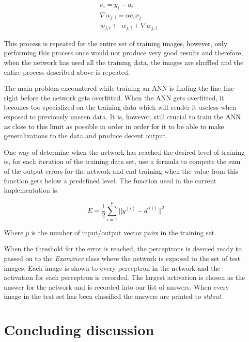\documentclass[12pt]{article}
\begin{document}
\begin{align*}
  &e_i = y_i - a_i\\
  &\nabla w_{j,i} = \alpha e_ix_j\\
  &w_{j,i} \leftarrow w_{j,i} + \nabla w_{j,i}
\end{align*}

This process is repeated for the entire set of training images, however,
only performing this process once would not produce very good results and
therefore, when the network has used all the training data, the images
are shuffled and the entire process described above is repeated.

The main problem encountered while training an ANN is finding the fine line
right before the network gets overfitted. When the ANN gets overfitted, it
becomes too specialized on the training data which will render it useless
when exposed to previously unseen data. It is, however, still crucial
to train the ANN as close to this limit as possible in order in order for
it to be able to make generalizations to the data and produce decent output.

One way of determine when the network has reached the desired level of training
is, for each iteration of the training data set, use a formula to compute the
sum of the output errors for the network and end training when the value from
this function gets below a predefined level. The function used in the current
implementation is:

\begin{equation*}
  E = \frac{1}{2}\sum^p_{i=1} ||y^{(i)} - d^{(i)}||^2
\end{equation*}

Where $p$ is the number of input/output vector pairs in the training set.

When the threshold for the error is reached, the perceptrons is deemed ready
to passed on to the \textit{Examiner} class where the network is exposed to
the set of test images. Each image is shown to every perceptron in the
network and the activation for each perceptron is recorded. The largest
activation is chosen as the answer for the network and is recorded into
our list of answers. When every image in the test set has been classified
the answers are printed to \textit{stdout}.

\section{Concluding discussion}
\end{document}
